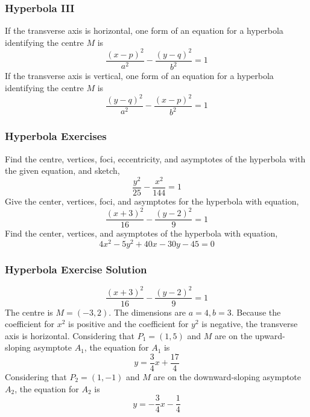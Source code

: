 \documentclass[xcolor=dvipsnames]{beamer}
\begin{document}
\begin{frame}
  \frametitle{Hyperbola III}
  If the transverse axis is horizontal, one form of an equation for a
  hyperbola identifying the centre $M$ is
\begin{equation}
  \label{eq:leiweidi}
\frac{(x-p)^{2}}{a^{2}}-\frac{(y-q)^{2}}{b^{2}}=1
\end{equation}
  If the transverse axis is vertical, one form of an equation for a
  hyperbola identifying the centre $M$ is
\begin{equation}
  \label{eq:aewailei}
\frac{(y-q)^{2}}{a^{2}}-\frac{(x-p)^{2}}{b^{2}}=1
\end{equation}
\end{frame}

\begin{frame}
  \frametitle{Hyperbola Exercises}
  Find the centre, vertices, foci, eccentricity, and asymptotes of the
  hyperbola with the given equation, and sketch,
\begin{equation}
  \label{eq:eezeisud}
\frac{y^{2}}{25}-\frac{x^{2}}{144}=1
\end{equation}
Give the center, vertices, foci, and asymptotes for the hyperbola
with equation,
\begin{equation}
  \label{eq:utheikuv}
\frac{(x+3)^{2}}{16}-\frac{(y-2)^{2}}{9}=1
\end{equation}
Find the center, vertices, and asymptotes of the hyperbola with
equation,
\begin{equation}
  \label{eq:beizooph}
4x^{2}-5y^{2}+40x-30y-45=0
\end{equation}
\end{frame}

\begin{frame}
  \frametitle{Hyperbola Exercise Solution}
\begin{equation}
  \label{eq:ieyuipoo}
\frac{(x+3)^{2}}{16}-\frac{(y-2)^{2}}{9}=1
\end{equation}
The centre is $M=(-3,2)$. The dimensions are $a=4,b=3$. Because the
coefficient for $x^{2}$ is positive and the coefficient for $y^{2}$ is
negative, the transverse axis is horizontal. Considering that
$P_{1}=(1,5)$ and $M$ are on the upward-sloping asymptote $A_{1}$, the
equation for $A_{1}$ is 
\begin{equation}
  \label{eq:maighere}
y=\frac{3}{4}x+\frac{17}{4}
\end{equation}
Considering that
$P_{2}=(1,-1)$ and $M$ are on the downward-sloping asymptote $A_{2}$, the equation for $A_{2}$ is 
\begin{equation}
  \label{eq:eeleeyae}
y=-\frac{3}{4}x-\frac{1}{4}
\end{equation}
\end{frame}
\end{document}
